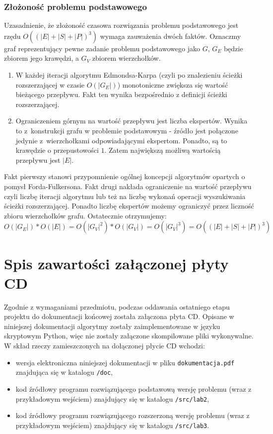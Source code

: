\documentclass[12pt,a4paper]{article}
\theoremstyle{definition}
\begin{document}
\subsubsection{Złożoność problemu podstawowego} \label{boundedflow}
Uzasadnienie, że złożoność czasowa rozwiązania problemu podstawowego jest rzędu $O((|E| + |S| + |P|)^3)$ wymaga zauważenia dwóch faktów. Oznaczmy graf reprezentujący pewne zadanie problemu podstawowego jako $G$, $G_E$ będzie zbiorem jego krawędzi, a $G_V$ zbiorem wierzchołków.
\begin{enumerate}
	\item W każdej iteracji algorytmu Edmondsa-Karpa (czyli po znalezieniu ścieżki rozszerzającej w czasie $O(|G_E|)$) monotoniczne zwiększa się wartość bieżącego przepływu. Fakt ten wynika bezpośrednio z definicji ścieżki rozszerzającej.
	\item Ograniczeniem górnym na wartość przepływu jest liczba ekspertów. Wynika to z~konstrukcji grafu w problemie podstawowym - źródło jest połączone jedynie z~wierzchołkami odpowiadającymi ekspertom. Ponadto, są to krawędzie o przepustowości $1$. Zatem największą możliwą wartością przepływu jest $|E|$.
\end{enumerate}
Fakt pierwszy stanowi przypomnienie ogólnej koncepcji algorytmów opartych o pomysł Forda-Fulkersona. Fakt drugi nakłada ograniczenie na wartość przepływu czyli liczbę iteracji algorytmu lub też na liczbę wykonań operacji wyszukiwania ścieżki rozszerzającej. Ponadto liczbę ekspertów możemy ograniczyć przez liczność zbioru wierzchołków grafu. Ostatecznie otrzymujemy:
$$O(|G_E|) * O(|E|) = O(|G_V|^2) * O(|G_V|) = O(|G_V|^3) = O((|E| + |S| + |P|)^3)$$

\newpage
\section{Spis zawartości załączonej płyty CD}
Zgodnie z wymaganiami przedmiotu, podczas oddawania ostatniego etapu projektu do dokumentacji końcowej została załączona płyta CD. Opisane w niniejszej dokumentacji algorytmy zostały zaimplementowane w języku skryptowym Python, więc nie zostały załączone skompilowane pliki wykonywalne.\\

\noindent
W skład rzeczy zamieszczonych na dołączonej płycie CD wchodzi:
\begin{itemize}
	\item wersja elektroniczna niniejszej dokumentacji w pliku \texttt{dokumentacja.pdf} znajdująca się w katalogu \texttt{/doc},
	\item kod źródłowy programu rozwiązującego podstawową wersję problemu (wraz z przykładowym wejściem) znajdujący się w katalogu \texttt{/src/lab2},
	\item kod źródłowy programu rozwiązującego rozszerzoną wersję problemu (wraz z przykładowym wejściem) znajdujący się w katalogu \texttt{/src/lab3}.
\end{itemize}
\end{document}
